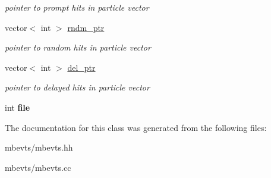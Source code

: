 \begin{DoxyCompactItemize}
\begin{DoxyCompactList}\small\item\em pointer to prompt hits in particle vector \end{DoxyCompactList}\item 
\hypertarget{classmbevts_aea8371f283b731fdba6e3af0e9a74852}{vector$<$ int $>$ \hyperlink{classmbevts_aea8371f283b731fdba6e3af0e9a74852}{rndm\-\_\-ptr}}\label{classmbevts_aea8371f283b731fdba6e3af0e9a74852}

\begin{DoxyCompactList}\small\item\em pointer to random hits in particle vector \end{DoxyCompactList}\item 
\hypertarget{classmbevts_ac5f29344cdf6ba222e9ccd437542ca16}{vector$<$ int $>$ \hyperlink{classmbevts_ac5f29344cdf6ba222e9ccd437542ca16}{del\-\_\-ptr}}\label{classmbevts_ac5f29344cdf6ba222e9ccd437542ca16}

\begin{DoxyCompactList}\small\item\em pointer to delayed hits in particle vector \end{DoxyCompactList}\item 
\hypertarget{classmbevts_ab0eb943464d109e2218004991e175938}{int {\bfseries file}}\label{classmbevts_ab0eb943464d109e2218004991e175938}

\end{DoxyCompactItemize}


The documentation for this class was generated from the following files\-:\begin{DoxyCompactItemize}
\item 
mbevts/mbevts.\-hh\item 
mbevts/mbevts.\-cc\end{DoxyCompactItemize}
